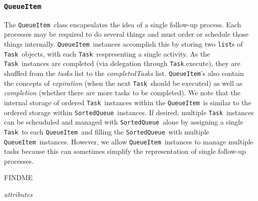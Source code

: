 \documentclass{article}
\newcommand{\SortedQueue}{\texttt{SortedQueue}}
\newcommand{\QueueItem}{\texttt{QueueItem}}
\newcommand{\Task}{\texttt{Task}}
\newcommand{\pythonlist}{\texttt{list}}
\begin{document}

\subsubsection{\QueueItem}
\label{sec: QueueItem}

The \QueueItem~class encapsulates the idea of a single follow-up process.
Each processes may be required to do several things and must order or schedule those things internally.
\QueueItem~instances accomplish this by storing two {\pythonlist}s of \Task~objects, with each \Task~respresenting a single activity.
As the \Task~instances are completed (via delegation through \Task.execute), they are shuffled from the \textit{tasks} list to the \textit{completedTasks} list.
\QueueItem's also contain the concepts of \textit{expiration} (when the next \Task~should be executed) as well as \textit{completion} (whether there are more tasks to be completed).
We note that the internal storage of ordered \Task~instances within the \QueueItem~is similar to the ordered storage within \SortedQueue~instances.
If desired, multiple \Task~instances can be scheuduled and managed with \SortedQueue~alone by assigning a single \Task~to each \QueueItem~and filling the \SortedQueue~with multiple \QueueItem~instances.
However, we allow \QueueItem~instances to manage multiple tasks because this can sometimes simplify the representation of single follow-up processes.

FINDME

\vspace{0.5cm}
\noindent
\textit{attributes}
\end{document}

